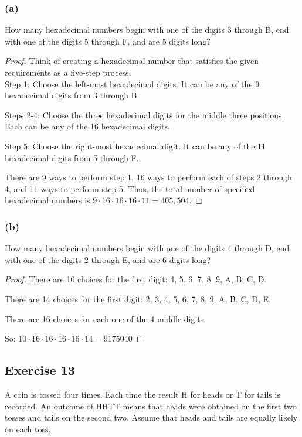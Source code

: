 \documentclass[14pt]{extarticle}
\newcommand{\cy}{\color{cyan}}
\begin{document}
\subsubsection{(a)}
How many hexadecimal numbers begin with one of the digits 3 through B, end with one of the digits 5 through F, and are
5 digits long?

\begin{proof}
     Think of creating a hexadecimal number that satisfies the given requirements as a five-step process. \\
     {\cy Step 1:} Choose the left-most hexadecimal digits. It can be any of the 9 hexadecimal digits from 3 through B.

          {\cy Steps 2-4:} Choose the three hexadecimal digits for the middle three positions. Each can be any of the 16
     hexadecimal digits.

          {\cy Step 5:} Choose the right-most hexadecimal digit. It can be any of the 11 hexadecimal digits from 5 through F.

     There are 9 ways to perform step 1, 16 ways to perform each of steps 2 through 4, and 11 ways to perform step 5. Thus,
     the total number of specified hexadecimal numbers is \(9 \cdot 16 \cdot 16 \cdot 16 \cdot 11 = 405,504\).
\end{proof}

\subsubsection{(b)}
How many hexadecimal numbers begin with one of the digits 4 through D, end with one of the digits 2 through E, and are
6 digits long?

\begin{proof}
     There are 10 choices for the first digit: 4, 5, 6, 7, 8, 9, A, B, C, D.

     There are 14 choices for the first digit: 2, 3, 4, 5, 6, 7, 8, 9, A, B, C, D, E.

     There are 16 choices for each one of the 4 middle digits.

     So: \(10 \cdot 16 \cdot 16 \cdot 16 \cdot 16 \cdot 14 = 9175040\)
\end{proof}

\subsection{Exercise 13}
A coin is tossed four times. Each time the result H for heads or T for tails is recorded. An outcome of HHTT means that heads were obtained on the first two tosses and tails on the second two. Assume that heads and tails are equally likely on each toss.
\end{document}
